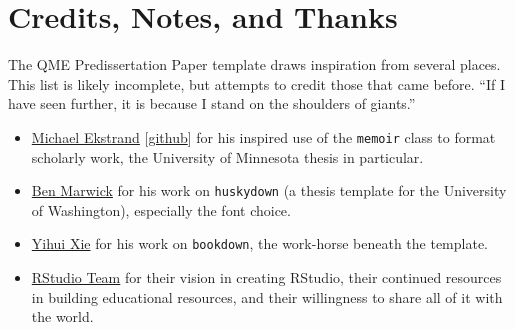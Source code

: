 \documentclass[12pt,letterpaper,oneside,oldfontcommands]{memoir}
\newenvironment{Shaded}{\begin{snugshade}}{\end{snugshade}}
\newcommand{\CommentTok}[1]{\textcolor[rgb]{0.56,0.35,0.01}{\textit{#1}}}
\newcommand{\ControlFlowTok}[1]{\textcolor[rgb]{0.13,0.29,0.53}{\textbf{#1}}}
\newcommand{\DataTypeTok}[1]{\textcolor[rgb]{0.13,0.29,0.53}{#1}}
\newcommand{\KeywordTok}[1]{\textcolor[rgb]{0.13,0.29,0.53}{\textbf{#1}}}
\newcommand{\NormalTok}[1]{#1}
\newcommand{\OperatorTok}[1]{\textcolor[rgb]{0.81,0.36,0.00}{\textbf{#1}}}
\newcommand{\StringTok}[1]{\textcolor[rgb]{0.31,0.60,0.02}{#1}}
\providecommand{\tightlist}{%
  \setlength{\itemsep}{0pt}\setlength{\parskip}{0pt}}
\theoremstyle{definition}
\theoremstyle{definition}
\theoremstyle{definition}
\theoremstyle{remark}
\begin{document}
\begin{Shaded}
\end{Shaded}

\hypertarget{credits-notes-and-thanks}{%
\section{Credits, Notes, and Thanks}\label{credits-notes-and-thanks}}

The QME Predissertation Paper template draws inspiration from several
places. This list is likely incomplete, but attempts to credit those
that came before. ``If I have seen further, it is because I stand on the
shoulders of giants.''

\begin{itemize}
\tightlist
\item
  \href{https://md.ekstrandom.net/resources/umn-thesis/}{Michael
  Ekstrand}
  {[}\href{https://github.com/mdekstrand/umn-thesis}{github}{]} for his
  inspired use of the \texttt{memoir} class to format scholarly work,
  the University of Minnesota thesis in particular.
\item
  \href{https://github.com/benmarwick/huskydown/blob/master/README.md}{Ben
  Marwick} for his work on \texttt{huskydown} (a thesis template for the
  University of Washington), especially the font choice.
\item
  \href{https://bookdown.org/yihui/bookdown/}{Yihui Xie} for his work on
  \texttt{bookdown}, the work-horse beneath the template.
\item
  \href{https://www.rstudio.com/}{RStudio Team} for their vision in
  creating RStudio, their continued resources in building educational
  resources, and their willingness to share all of it with the world.
\end{itemize}
\end{document}
